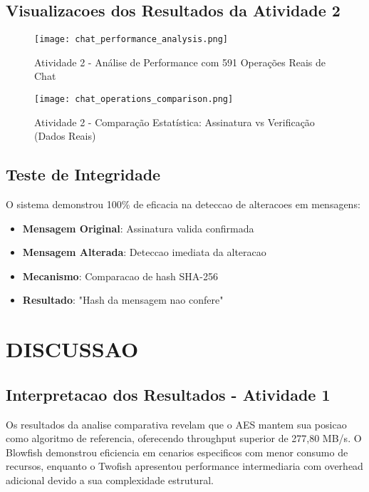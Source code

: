 \documentclass[12pt,a4paper,oneside]{article}
\begin{document}
\subsection{Visualizacoes dos Resultados da Atividade 2}

\begin{figure}[H]
\centering
\texttt{[image: chat\_performance\_analysis.png]}
\caption{Atividade 2 - Análise de Performance com 591 Operações Reais de Chat}
\label{fig:signature_performance}
\end{figure}

\begin{figure}[H]
\centering
\texttt{[image: chat\_operations\_comparison.png]}
\caption{Atividade 2 - Comparação Estatística: Assinatura vs Verificação (Dados Reais)}
\label{fig:signature_comparison}
\end{figure}

\subsection{Teste de Integridade}

O sistema demonstrou 100\% de eficacia na deteccao de alteracoes em mensagens:

\begin{itemize}
    \item \textbf{Mensagem Original}: Assinatura valida confirmada
    \item \textbf{Mensagem Alterada}: Deteccao imediata da alteracao
    \item \textbf{Mecanismo}: Comparacao de hash SHA-256
    \item \textbf{Resultado}: "Hash da mensagem nao confere"
\end{itemize}

\section{DISCUSSAO}

\subsection{Interpretacao dos Resultados - Atividade 1}

Os resultados da analise comparativa revelam que o AES mantem sua posicao como algoritmo de referencia, oferecendo throughput superior de 277,80 MB/s. O Blowfish demonstrou eficiencia em cenarios especificos com menor consumo de recursos, enquanto o Twofish apresentou performance intermediaria com overhead adicional devido a sua complexidade estrutural.
\end{document}
